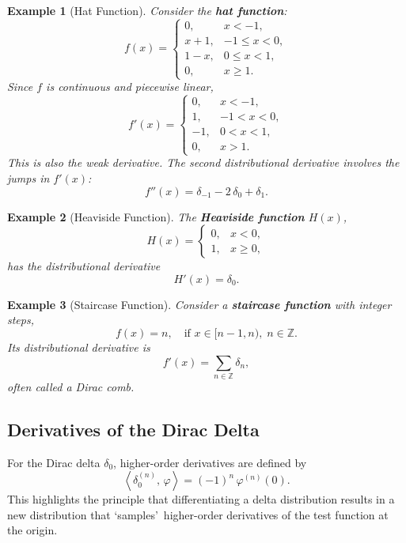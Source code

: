 \documentclass[11pt,openany]{book}
\newcommand{\dist}[2]{\left\langle #1,\, #2 \right\rangle}
\newtheorem{example}{Example}[section]
\begin{document}
\begin{example}[Hat Function]
Consider the \textbf{hat function}:
\[
f(x) =
\begin{cases}
0, & x < -1,\\
x + 1, & -1 \le x < 0,\\
1 - x, & 0 \le x < 1,\\
0, & x \ge 1.
\end{cases}
\]
Since $f$ is continuous and piecewise linear,
\[
f'(x) =
\begin{cases}
0, & x < -1,\\
1, & -1 < x < 0,\\
-1, & 0 < x < 1,\\
0, & x > 1.
\end{cases}
\]
This is also the \emph{weak derivative}. The \emph{second} distributional derivative involves the jumps in $f'(x)$:
\[
f''(x) = \delta_{-1} - 2\,\delta_{0} + \delta_{1}.
\]
\end{example}

\begin{example}[Heaviside Function]
The \textbf{Heaviside function} $H(x)$,
\[
H(x) =
\begin{cases}
0, & x < 0,\\
1, & x \ge 0,
\end{cases}
\]
has the distributional derivative
\[
H'(x) = \delta_0.
\]
\end{example}

\begin{example}[Staircase Function]
Consider a \textbf{staircase function} with integer steps,
\[
f(x) = n, \quad \text{if } x \in [n-1,n), \; n \in \mathbb{Z}.
\]
Its distributional derivative is
\[
f'(x) = \sum_{n \in \mathbb{Z}} \delta_n,
\]
often called a \emph{Dirac comb}.
\end{example}

\subsection{Derivatives of the Dirac Delta}

\noindent
For the Dirac delta $\delta_0$, higher-order derivatives are defined by
\[
\dist{\delta_0^{(n)}}{\varphi}
= (-1)^n \,\varphi^{(n)}(0).
\]
This highlights the principle that differentiating a delta distribution results in a new distribution that \textquoteleft samples\textquoteright\ higher-order derivatives of the test function at the origin.

\medskip
\begin{center}
  \hrulefill
\end{center}
\end{document}
